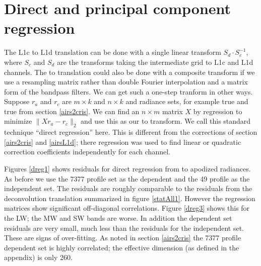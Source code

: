 \documentclass[journal]{IEEEtran}
\begin{document}
\section{Direct and principal component regression}
\label{dregr}

The {\airs} L1c to L1d translation can be done with a single 
linear transform $S_d\cdot S_c^{-1}$, where $S_c$ and $S_d$ are the
transforms taking the intermediate grid to L1c and L1d channels.
The {\airs} to {\cris} translation could also be done with a
composite transform if we use a resampling matrix rather than
double Fourier interpolation and a matrix form of the bandpass
filters.  We can get such a one-step tranform in other ways.
Suppose $r_a$ and $r_c$ are $m \times k$ and $n \times k$ {\airs}
and {\cris} radiance sets, for example true {\airs} and true {\cris}
from section \ref{airs2cris}.  We can find an $n \times m$ matrix
$X$ by regression to minimize $\|X r_a - r_c\|_2$ and use this as
our {\airs} to {\cris} transform.  We call this standard technique
``direct regression'' here.  This is different from the corrections
of section \ref{airs2cris} and \ref{airsL1d}; there regression was
used to find linear or quadratic correction coefficients
independently for each channel.


Figures \ref{dreg1} shows residuals for direct regression from
{\airs} to apodized {\cris} radiances.  As before we use the 7377
profile set as the dependent and the 49 profile as the independent
set.  The residuals are roughly comparable to the residuals from
the deconvolution translation summarized in figure \ref{statAll1}.
However the regression matrices show significant off-diagonal
correlations.  Figure \ref{dreg3} shows this for the LW; the MW and
SW bands are worse.  In addition the dependent set residuals are
very small, much less than the residuals for the independent set.
These are signs of over-fitting.  As noted in section \ref{airs2cris}
the 7377 profile dependent set is highly correlated; the effective
dimension (as defined in the appendix) is only 260.

\end{document}
